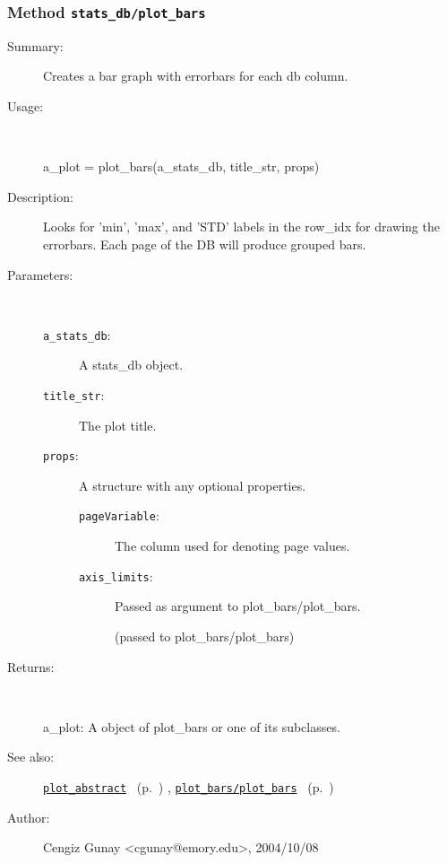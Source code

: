 \subsubsection[Method \texttt{plot\_bars}]{Method \texttt{stats\_db/plot\_bars}}%
%
\label{ref_stats_db__plot_bars}%
\hypertarget{ref_stats_db__plot_bars}{}%
\begin{description}
\item[Summary:]Creates a bar graph with errorbars for each db column. 
%
\item[Usage:]~%
\begin{lyxcode}%
a\_plot = plot\_bars(a\_stats\_db, title\_str, props)
%
\end{lyxcode}%
%
\item[Description:]%
Looks for 'min', 'max', and 'STD' labels in the row\_idx for drawing the errorbars. 
 Each page of the DB will produce grouped bars.
\item[Parameters:]~
\begin{description}%
\item[\texttt{a\_stats\_db}:]
 A stats\_db object.
\item[\texttt{title\_str}:]
 The plot title.
\item[\texttt{props}:]
 A structure with any optional properties.
\begin{description}%
\item[\texttt{pageVariable}:]
 The column used for denoting page values.
\item[\texttt{axis\_limits}:]
 Passed as argument to plot\_bars/plot\_bars.

(passed to plot\_bars/plot\_bars)
\end{description}%
\end{description}%
%
\item[Returns:
]~

	a\_plot: A object of plot\_bars or one of its subclasses.
%
%
\item[See also:]%
\hyperlink{ref_plot_abstract}{\texttt{plot\_abstract}}%
\ (p.~\pageref{ref_plot_abstract})%
%
, \hyperlink{ref_plot_bars__plot_bars}{\texttt{plot\_bars/plot\_bars}}%
\ (p.~\pageref{ref_plot_bars__plot_bars})%
%
%
\item[Author:]%
Cengiz Gunay <cgunay@emory.edu>, 2004/10/08
%
\end{description}
\methodline%

